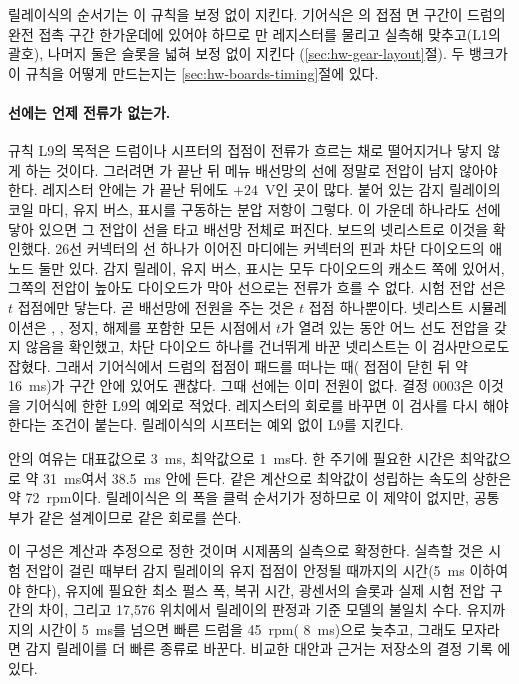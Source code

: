 릴레이식의 순서기는 이 규칙을 보정 없이 지킨다. 기어식은 의 접점 면 구간이 드럼의 완전 접촉 구간 한가운데에
있어야 하므로 만 레지스터를 물리고 실측해 맞추고(L1의 괄호), 나머지 둘은 슬롯을 넓혀 보정 없이 지킨다
(\ref{sec:hw-gear-layout}절). 두 뱅크가 이 규칙을 어떻게 만드는지는 \ref{sec:hw-boards-timing}절에 있다.

\paragraph{선에는 언제 전류가 없는가.} 규칙 L9의 목적은 드럼이나 시프터의 접점이 전류가 흐르는 채로 떨어지거나 닿지
않게 하는 것이다. 그러려면 가 끝난 뒤 메뉴 배선망의 선에 정말로 전압이 남지 않아야 한다. 레지스터 안에는
가 끝난 뒤에도 $+24$~V인 곳이 많다. 붙어 있는 감지 릴레이의 코일 마디, 유지 버스, 표시를 구동하는
분압 저항이 그렇다. 이 가운데 하나라도 선에 닿아 있으면 그 전압이 선을 타고 배선망 전체로 퍼진다. 보드의 넷리스트로
이것을 확인했다. 26선 커넥터의 선 하나가 이어진 마디에는 커넥터의 핀과 차단 다이오드의 애노드 둘만 있다. 감지
릴레이, 유지 버스, 표시는 모두 다이오드의 캐소드 쪽에 있어서, 그쪽의 전압이 높아도 다이오드가 막아 선으로는 전류가
흐를 수 없다. 시험 전압 선은 $t$ 접점에만 닿는다. 곧 배선망에 전원을 주는 것은 $t$ 접점 하나뿐이다. 넷리스트
시뮬레이션은 , , 정지, 해제를 포함한 모든 시점에서 $t$가 열려 있는 동안 어느 선도 전압을
갖지 않음을 확인했고, 차단 다이오드 하나를 건너뛰게 바꾼 넷리스트는 이 검사만으로도 잡혔다. 그래서 기어식에서
드럼의 접점이 패드를 떠나는 때( 접점이 닫힌 뒤 약 16~ms)가  구간 안에 있어도 괜찮다. 그때
선에는 이미 전원이 없다. 결정 0003은 이것을 기어식에 한한 L9의 예외로 적었다. 레지스터의 회로를 바꾸면 이 검사를
다시 해야 한다는 조건이 붙는다. 릴레이식의 시프터는 예외 없이 L9를 지킨다.

 안의 여유는 대표값으로 3~ms, 최악값으로 1~ms다. 한 주기에 필요한 시간은 최악값으로 약
31~ms여서 38.5~ms 안에 든다. 같은 계산으로 최악값이 성립하는 속도의 상한은 약 72~rpm이다. 릴레이식은
의 폭을 클럭 순서기가 정하므로 이 제약이 없지만, 공통부가 같은 설계이므로 같은 회로를 쓴다.

이 구성은 계산과 추정으로 정한 것이며 시제품의 실측으로 확정한다. 실측할 것은 시험 전압이 걸린 때부터
감지 릴레이의 유지 접점이 안정될 때까지의 시간(5~ms 이하여야 한다), 유지에 필요한 최소 펄스 폭, 복귀 시간,
광센서의 슬롯과 실제 시험 전압 구간의 차이, 그리고 17,576 위치에서 릴레이의 판정과 기준 모델의 불일치
수다. 유지까지의 시간이 5~ms를 넘으면 빠른 드럼을 45~rpm( 8~ms)으로 늦추고, 그래도 모자라면
감지 릴레이를 더 빠른 종류로 바꾼다. 비교한 대안과 근거는 저장소의 결정 기록
에 있다.

